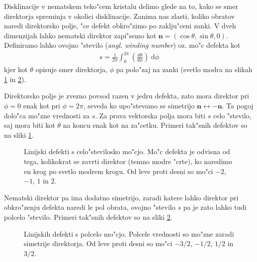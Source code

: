 \documentclass[12pt,twoside,openright,final,a4paper]{report}
\renewcommand{\vec}{\mathbf}
\newcommand{\angl}[1]{(\textit{angl. #1})}
\newcommand{\dd}{\ensuremath{\;\mathrm{d}}}
\begin{document}
Disklinacije v nematskem teko"cem kristalu delimo glede na to, kako se smer direktorja spreminja v okolici disklinacije. 
Zanima nas zlasti, koliko obratov naredi direktorsko polje, "ce defekt obkro"zimo po zaklju"ceni zanki. 
V dveh dimenzijah lahko nematski direktor zapi"semo kot $\vec n = (\cos\theta, \sin\theta, 0)$. 
Definiramo lahko ovojno "stevilo \angl{winding number} oz. mo"c defekta kot
\begin{align}
\label{eq:winding-number}
 s = \frac{1}{2\pi}\int_0^{2\pi} \left(\frac{d\theta}{d\phi}\right) \dd \phi
\end{align}
kjer kot $\theta$ opisuje smer direktorja, $\phi$ pa polo"zaj na zanki (svetlo modra na slikah \ref{fig:defekti-celi} in \ref{fig:defekti-polceli}). 

Direktorsko polje je zvezno povsod razen v jedru defekta, zato mora direktor pri $\phi = 0$ enak kot pri $\phi = 2\pi$, seveda ko upo"stevamo se simetrijo $\vec n \leftrightarrow -\vec n$.
Ta pogoj dolo"ca mo"zne vrednosti za $s$. 
Za prava vektorska polja mora biti $s$ celo "stevilo, saj mora biti kot $\theta$ na koncu enak kot na za"cetku. 
Primeri tak"snih defektov so na sliki \ref{fig:defekti-celi}. 

\begin{figure}[h]
 \centering
 \caption{Linijski defekti s celo"stevilosko mo"cjo. Mo"c defekta je odvisna od tega, kolikokrat se zavrti direktor (temno modre "crte), ko naredimo en krog po svetlo modrem krogu. Od leve proti desni so mo"ci $-2$, $-1$, $1$ in $2$. }
 \label{fig:defekti-celi}
\end{figure}

Nematski direktor pa ima dodatno simetrijo, zaradi katere lahko direktor pri obkro"zenju defekta naredi le pol obrata, ovojno "stevilo $s$ pa je zato lahko tudi polcelo "stevilo. 
Primeri tak"snih defektov so na sliki \ref{fig:defekti-polceli}. 

\begin{figure}[h]
 \centering
 \caption{Linijskih defekti s polcelo mo"cjo. Polcele vrednosti so mo"zne zaradi simetrije direktorja. Od leve proti desni so mo"ci $-3/2$, $-1/2$, $1/2$ in $3/2$. }
 \label{fig:defekti-polceli}
\end{figure}
\end{document}
